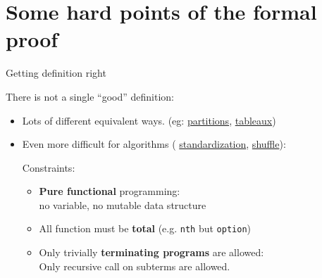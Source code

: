 \documentclass[compress,11pt]{beamer}
\begin{document}
\section{Some hard points of the formal proof}

\begin{frame}[fragile]{Getting definition right}

There is not a single ``good'' definition:
\bigskip

\begin{itemize}
\item Lots of different equivalent ways. (eg:
\href{file:html/Combi.Combi.partition.html#is_part}{partitions},
\href{file:html/Combi.Combi.tableau.html#is_tableau}{tableaux})
\bigskip\pause

\item Even more difficult for algorithms (
\href{file:html/Combi.Combi.std.html#std_rec}{standardization},
\href{file:html/Combi.LRrule.shuffle.html#shuffle_from_rec}{shuffle}):
  \medskip

  Constraints:
  \begin{itemize}
  \item \textbf{Pure functional} programming: \\
    no variable, no mutable data structure
    \bigskip
  \item All function must be \textbf{total} (e.g. \texttt{nth} but \texttt{option}) \\
    \bigskip
  \item Only trivially \textbf{terminating programs} are allowed:\\
    Only recursive call on subterms are allowed.

  \end{itemize}
\end{itemize}
\end{frame}
\end{document}
